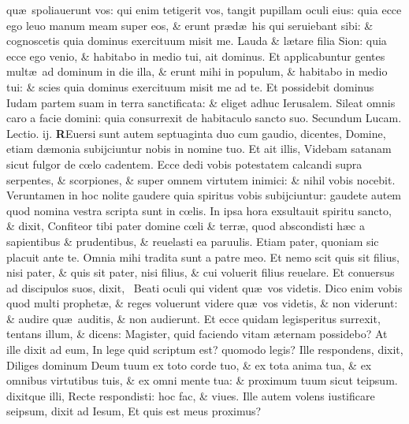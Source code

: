 \documentclass[a5paper,10pt]{book}
\def\leftmarginnote{%
	\lrmarginnote{\hskip -\marginparsep \hskip -6.5em}}
\def\rightmarginnote{%
	\lrmarginnote{\hskip\columnwidth \hskip -1em}}
\def\ae{æ}
\def\oe{œ}
\begin{document}
\begin{multicols*}{2}
qu\ae \ spoliauerunt vos: qui enim tetigerit vos, tangit pupillam oculi eius: quia ecce ego leuo manum meam super eos, \& erunt pr\ae d\ae \ his qui seruiebant sibi: \& cognoscetis quia dominus exercituum misit me.
Lauda \& l\ae tare filia Sion: quia ecce ego venio, \& habitabo in medio tui, ait dominus.
Et applicabuntur gentes mult\ae \ ad dominum in die illa, \& erunt mihi in populum, \& habitabo in medio tui: \& scies quia dominus exercituum misit me ad te.
Et possidebit dominus Iudam partem suam in terra sanctificata: \& eliget adhuc Ierusalem.
Sileat omnis caro a facie domini: quia consurrexit de habitaculo sancto suo.
\fancyhead[C]{\color{red} Feria. v. Dominic\ae . iiij. aduentus}
\newline \color{red} Secundum\leftmarginnote{\begin{flushright}c. 10.\\c\end{flushright}} Lucam. \hfill Lectio. ij. \color{black}
\vspace{-.25em}
\lettrine[lines=2]{\bfseries \color{red} R}{}Euersi sunt autem septuaginta duo cum gaudio, dicentes, Domine, etiam d\ae monia subijciuntur nobis in nomine tuo.
Et ait illis, Videbam satanam sicut fulgor de c\oe lo cadentem.
Ecce dedi vobis potestatem calcandi supra serpentes, \& scorpiones, \& super omnem virtutem inimici: \& nihil vobis nocebit.
Veruntamen in hoc nolite gaudere quia spiritus vobis subijciuntur: gaudete autem quod nomina vestra scripta sunt in c\oe lis.
In ipsa hora exsultauit spiritu sancto, \& dixit, Confiteor tibi pater domine c\oe li \& terr\ae , quod abscondisti h\ae c a sapientibus \& prudentibus, \& reuelasti ea paruulis. Etiam pater, quoniam sic placuit ante te.
Omnia mihi tradita sunt a patre meo. Et nemo scit quis sit filius, nisi pater, \& quis sit pater, nisi filius, \& cui voluerit filius reuelare.
Et conuersus ad discipulos suos, dixit, \textdagger \ Beati\rightmarginnote{D} oculi qui vident qu\ae \ vos videtis.
Dico enim vobis quod multi prophet\ae , \& reges voluerunt videre qu\ae \ vos videtis, \& non viderunt: \& audire qu\ae \ auditis, \& non audierunt.
Et ecce quidam legisperitus surrexit, tentans illum, \& dicens: Magister, quid faciendo vitam \ae ternam possidebo?
At ille dixit ad eum, In lege quid scriptum est? quomodo legis?
Ille respondens, dixit, Diliges dominum Deum tuum ex toto corde tuo, \& ex tota anima tua, \& ex omnibus virtutibus tuis, \& ex omni mente tua: \& proximum tuum sicut teipsum. dixitque illi, Recte respondisti: hoc fac, \& viues.
Ille autem volens iustificare seipsum, dixit ad Iesum, Et quis est meus proximus?

\end{multicols*}
\end{document}
